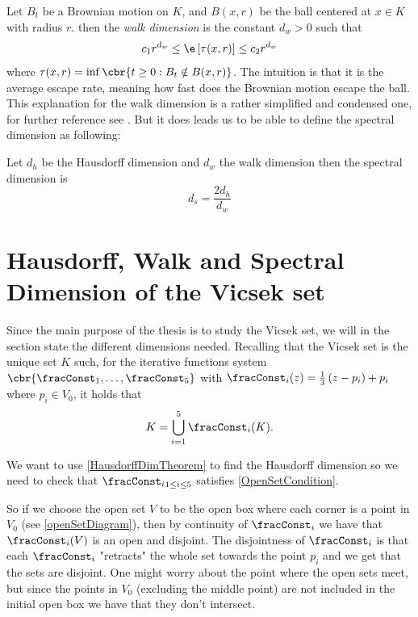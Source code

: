 Let $B_t$ be a Brownian motion on $K$, and $B(x,r)$ be the ball centered at $x \in K$ with radius $r$. then the \emph{walk dimension} is the constant $d_w > 0$ such that
\begin{equation}
	c_1 r^{d_w} \leq \e \left[\tau(x,r)\right] \leq c_2 r^{d_w}
\end{equation}
where $\tau(x,r) = \inf\cbr{t \geq 0 : B_t \notin B(x,r)}$.  The intuition is that it is the average escape rate, meaning how fast does the Brownian motion escape the ball. This explanation for the walk dimension is a rather simplified and condensed one, for further reference see \cite[Chapter 3]{barlow}. But it does leads us to be able to define the spectral dimension as following:
\begin{defi}\label{spectralDimDefi}
	Let $d_h$ be the Hausdorff dimension and $d_w$ the walk dimension then the spectral dimension is
	\begin{equation}
		d_s = \frac{2 d_h}{d_w}
	\end{equation}
\end{defi}

\section{Hausdorff, Walk and Spectral Dimension of the Vicsek set}

Since the main purpose of the thesis is to study the Vicsek set, we will in the section state the different dimensions needed. Recalling that the Vicsek set is the unique set $K$ such, for the iterative functions system $\cbr{\fracConst_1, \ldots, \fracConst_{5}}$ with $\fracConst_{i}(z) = \frac{1}{3}\left(z -p_i\right) + p_i$ where $p_i \in V_0$, it holds that
\begin{equation}
	K = \bigcup_{i =1}^{5} \fracConst_{i}(K).
\end{equation}

We want to use \cref{HausdorffDimTheorem} to find the Hausdorff dimension so we need to check that ${\fracConst_i}_{1 \leq i \leq 5}$ satisfies \cref{OpenSetCondition}. 

So if we choose the open set $V$ to be the open box where each corner is a point in $V_0$ (see \cref{openSetDiagram}), then by continuity of $\fracConst_{i}$ we have that $\fracConst_{i}(V)$ is an open and disjoint. The disjointness of $\fracConst_{i}$ is that each $\fracConst_{i}$ "retracts" the whole set towards the point $p_i$ and we get that the sets are disjoint. One might worry about the point where the open sets meet, but since the points in $V_0$ (excluding the middle point) are not included in the initial open box we have that they don't intersect.


